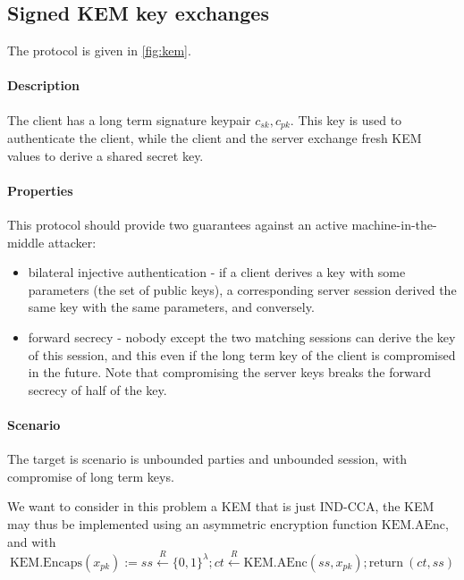 \documentclass{article}
\newcommand{\store}{\leftarrow}
\newcommand{\getR}{\stackrel{R}{\store}}
\newcommand{\sfsk}{\mathit{sk}}
\newcommand{\sfpk}{\mathit{pk}}
\newcommand{\sfss}{\mathit{ss}}
\newcommand{\sfct}{\mathit{ct}}
\newcommand{\kwf}[1]{\mathrm{#1}}
\newcommand{\encaps}{\kwf{KEM.Encaps}}
\newcommand{\aenckem}{\kwf{KEM.AEnc}}
\newcommand{\return}{\kwf{return}}
\begin{document}
\subsection{Signed KEM key exchanges}\label{prob:kem}

The protocol is given in \cref{fig:kem}.

 \paragraph{Description} The client has a long term signature keypair $c_\sfsk,c_\sfpk$.
This key is used to authenticate the client, while the client and the server exchange fresh KEM values to derive a shared secret key.

\paragraph{Properties} This protocol should provide two guarantees against an active machine-in-the-middle attacker:
\begin{itemize}
\item bilateral injective authentication -  if a client derives a key with some parameters (the set of public keys), a corresponding server session derived the same key with the same parameters, and conversely.
\item forward secrecy - nobody except the two matching sessions can derive the key of this session, and this even if the long term key of the client is compromised in the future. Note that compromising the server keys breaks the forward secrecy of half of the key.
\end{itemize}

\paragraph{Scenario} The target is scenario is unbounded parties and unbounded session, with compromise of long term keys.
 
We want to consider in this problem a KEM that is just IND-CCA, the KEM may thus be implemented using an asymmetric encryption function $\aenckem$, and with
$$\encaps(x_\sfpk) := \sfss \getR \{0,1\}^\lambda; \sfct \getR \aenckem(\sfss,x_\sfpk); \return~(\sfct,\sfss)  $$
\end{document}
